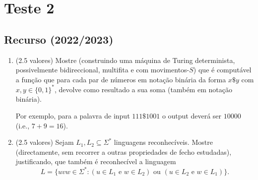 \documentclass[a4paper,12pt]{article}
\begin{document}
\vspace{1.0cm}
\section*{Teste 2}
\subsection*{Recurso (2022/2023)}
\begin{enumerate}[label=\alph*)]
  \item (2.5 valores) Mostre (construindo uma máquina de Turing determinista, possivelmente bidireccional, multifita e com movimentos-\(S\)) que é computável a função que para cada par de números em notação binária da forma \(x\$y\) com \(x, y \in \{0, 1\}^*\), devolve como resultado a sua soma (também em notação binária).

  Por exemplo, para a palavra de input \(111\$1001\) o output deverá ser \(10000\) (i.e., \(7 + 9 = 16\)).

  \item (2.5 valores) Sejam \(L_1, L_2 \subseteq \Sigma^*\) linguagens reconhecíveis. Mostre (directamente, sem recorrer a outras propriedades de fecho estudadas), justificando, que também é reconhecível a linguagem
  \[L = \{uvw \in \Sigma^* : (u \in L_1 \text{ e } w \in L_2) \text{ ou } (u \in L_2 \text{ e } w \in L_1)\}.\]
\end{enumerate}
\end{document}
